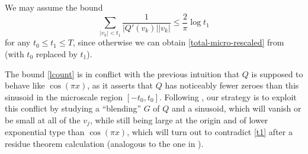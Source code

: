 \documentclass[12pt]{amsart}
\begin{document}
We may assume the bound
\begin{equation}\label{t1}
     \sum_{|v_k| < t_1} \frac{1}{|Q'(v_k)| |v_k|} \leq \frac{2}{\pi} \log t_1
\end{equation}
for any $t_0 \leq t_1 \leq T$, since otherwise we can obtain \eqref{total-micro-rescaled} from  (with $t_0$ replaced by $t_1$).

The bound \eqref{lcount} is in conflict with the previous intuition that $Q$ is supposed to behave like $\cos(\pi x)$, as it asserts that $Q$ has noticeably fewer zeroes than this sinusoid in the microscale region $[-t_0,t_0]$.  Following \cite{erdos}, our strategy is to exploit this conflict by studying a ``blending'' $G$ of $Q$ and a sinusoid, which will vanish or be small at all of the $v_j$, while still being large at the origin and of lower exponential type than $\cos(\pi x)$, which will turn out to contradict \eqref{t1} after a residue theorem calculation (analogous to the one in ).
\end{document}
